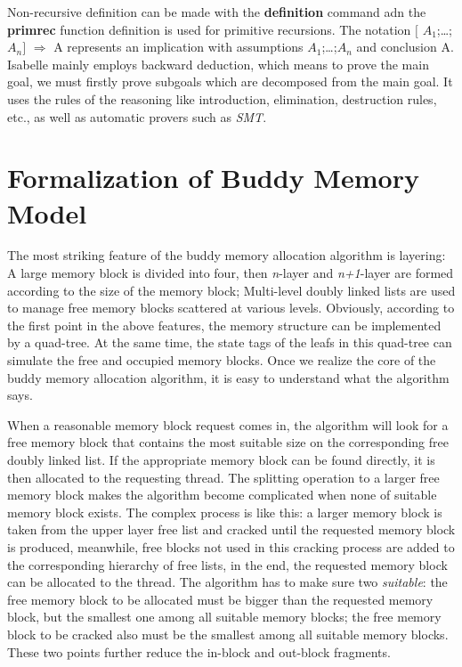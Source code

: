 \documentclass[runningheads]{llncs}
\begin{document}
Non-recursive definition can be made with the \textbf{definition} command adn the \textbf{primrec} function definition is used for primitive recursions. The notation $\lbrack$ $A_1$;\dots;$A_n$$\rbrack$ $\Longrightarrow$ A represents an implication with assumptions $A_1$;\dots;$A_n$ and conclusion A. Isabelle mainly employs backward deduction, which means to prove the main goal, we must firstly prove subgoals which are decomposed from the main goal. It uses the rules of the reasoning like introduction, elimination, destruction rules, etc., as well as automatic provers such as \textsl{SMT}.


\section{Formalization of Buddy Memory Model}
The most striking feature of the buddy memory allocation algorithm is layering: A large memory block is divided into four, then \textsl{n}-layer and \textsl{n+1}-layer are formed according to the size of the memory block; Multi-level doubly linked lists are used to manage free memory blocks scattered at various levels. Obviously, according to the first point in the above features, the memory structure can be implemented by a quad-tree. At the same time, the state tags of the leafs in this quad-tree can simulate the free and occupied memory blocks. Once we realize the core of the buddy memory allocation algorithm, it is easy to understand what the algorithm says.

When a reasonable memory block request comes in, the algorithm will look for a free memory block that contains the most suitable size on the corresponding free doubly linked list. If the
appropriate memory block can be found directly, it is then allocated to the requesting thread. The splitting operation to a larger free memory block makes the algorithm become complicated when none of suitable memory block exists. The complex process is like this: a larger memory block is taken from the upper layer free list and cracked until the requested memory block is produced, meanwhile, free blocks not used in this cracking process are added to the corresponding hierarchy of free lists, in the end, the requested memory block can be allocated to the thread. The algorithm has to make sure two \textsl{suitable}: the free memory block to be allocated must be bigger than the requested memory block, but the smallest one among all suitable memory blocks; the free memory block to be cracked also must be the smallest among all suitable memory blocks. These two points further reduce the in-block and out-block fragments.
\end{document}
